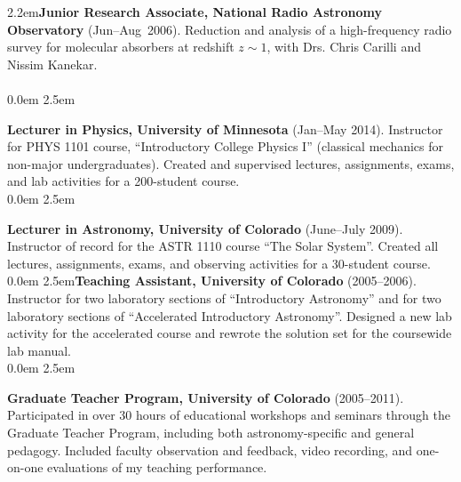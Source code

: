 \hangindent2.2em{\large {\bf{\sc Junior Research Associate}, National Radio Astronomy Observatory} (Jun--Aug~2006)}. Reduction and analysis of a high-frequency radio survey for molecular absorbers at redshift $z\sim1$, with Drs. Chris Carilli and Nissim Kanekar. \\[4pt]

\medskip
\medskip
{}\\[4pt]
\parindent 0.0em
\hangindent2.5em{\large {\bf{\sc Lecturer in Physics}, University of Minnesota} (Jan--May 2014). Instructor for PHYS 1101 course, ``Introductory College Physics I'' (classical mechanics for non-major undergraduates). Created and supervised lectures, assignments, exams, and lab activities for a 200-student course.\\[4pt]

\parindent 0.0em
\hangindent2.5em{\large {\bf{\sc Lecturer in Astronomy}, University of Colorado} (June--July 2009). Instructor of record for the ASTR 1110 course ``The Solar System''. Created all lectures, assignments, exams, and observing activities for a 30-student course.\\[4pt]

%
\parindent 0.0em
\hangindent2.5em{\large {\bf{\sc Teaching Assistant}, University of Colorado} (2005--2006)}. Instructor for two laboratory sections of ``Introductory Astronomy'' and for two laboratory sections of ``Accelerated Introductory Astronomy''. Designed a new lab activity for the accelerated course and rewrote the solution set for the coursewide lab manual. \\[4pt]

\parindent 0.0em
\hangindent2.5em{\large {\bf{\sc Graduate Teacher Program}, University of Colorado} (2005--2011). Participated in over 30 hours of educational workshops and seminars through the Graduate Teacher Program, including both astronomy-specific and general pedagogy. Included faculty observation and feedback, video recording, and one-on-one evaluations of my teaching performance. \\[4pt]


\pagestyle{fancy}
\renewcommand{\headrulewidth}{1pt} %
\parindent0pt

}}}
